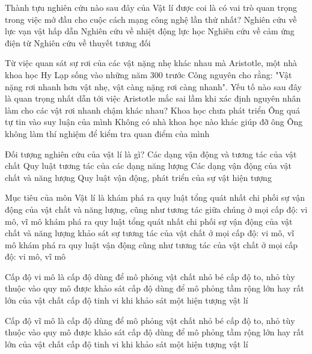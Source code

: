\begin{ex}
	Thành tựu nghiên cứu nào sau đây của Vật lí được coi là có vai trò quan trọng trong việc mở đầu cho cuộc cách mạng công nghệ lần thứ nhất?
	\choice
	{Nghiên cứu về lực vạn vật hấp dẫn}
	{\True Nghiên cứu về nhiệt động lực học}
	{Nghiên cứu về cảm ứng điện từ}
	{Nghiên cứu về thuyết tương đối}
	\loigiai{}
\end{ex}

\begin{ex}
	Từ việc quan sát sự rơi của các vật nặng nhẹ khác nhau mà Aristotle, một nhà khoa học Hy Lạp sống vào những năm 300 trước Công nguyên cho rằng: "Vật nặng rơi nhanh hơn vật nhẹ, vật càng nặng rơi càng nhanh". Yếu tố nào sau đây là quan trọng nhất dẫn tới việc Aristotle mắc sai lầm khi xác định nguyên nhân làm cho các vật rơi nhanh chậm khác nhau?
	\choice
	{Khoa học chưa phát triển}
	{Ông quá tự tin vào suy luận của mình}
	{Không có nhà khoa học nào khác giúp đỡ ông}
	{\True Ông không làm thí nghiệm để kiểm tra quan điểm của mình}
	\loigiai{}
\end{ex}

\begin{ex}
	Đối tượng nghiên cứu của vật lí là gì?
	\choice
	{Các dạng vận động và tương tác của vật chất}
	{Quy luật tương tác của các dạng năng lượng}
	{\True Các dạng vận động của vật chất và năng lượng}
	{Quy luật vận động, phát triển của sự vật hiện tượng}
	\loigiai{}
\end{ex}

\begin{ex}
	Mục tiêu của môn Vật lí là
	\choice
	{\True khám phá ra quy luật tổng quát nhất chi phối sự vận động của vật chất và năng lượng, cũng như tương tác giữa chúng ở mọi cấp độ: vi mô, vĩ mô}
	{khám phá ra quy luật tổng quát nhất chi phối sự vận động của vật chất và năng lượng}
	{khảo sát sự tương tác của vật chất ở mọi cấp độ: vi mô, vĩ mô}
	{khám phá ra quy luật vận động cũng như tương tác của vật chất ở mọi cấp độ: vi mô, vĩ mô}
	\loigiai{}
\end{ex}

\begin{ex}
	Cấp độ vi mô là
	\choice
	{\True cấp độ dùng để mô phỏng vật chất nhỏ bé}
	{cấp độ to, nhỏ tùy thuộc vào quy mô được khảo sát}
	{cấp độ dùng để mô phỏng tầm rộng lớn hay rất lớn của vật chất}
	{cấp độ tinh vi khi khảo sát một hiện tượng vật lí}
	\loigiai{}
\end{ex}

\begin{ex}
	Cấp độ vĩ mô là
	\choice
	{cấp độ dùng để mô phỏng vật chất nhỏ bé}
	{cấp độ to, nhỏ tùy thuộc vào quy mô được khảo sát}
	{\True cấp độ dùng để mô phỏng tầm rộng lớn hay rất lớn của vật chất}
	{cấp độ tinh vi khi khảo sát một hiện tượng vật lí}
	\loigiai{}
\end{ex}

